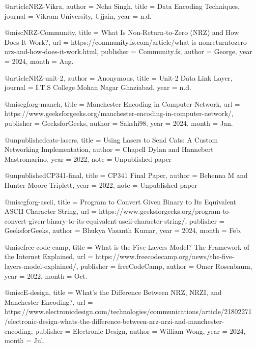 @article{NRZ-Vikra,
    author = {Neha Singh},
    title = {Data Encoding Techniques},
    journal = {Vikram University, Ujjain},
    year = {n.d.}
}

@misc{NRZ-Community, 
    title = {What Is Non-Return-to-Zero (NRZ) and How Does It Work?}, 
    url = {https://community.fs.com/article/what-is-nonreturntozero-nrz-and-how-does-it-work.html}, 
    publisher = {Community.fs}, 
    author = {George}, 
    year = {2024}, 
    month = {Aug.} 
}

@article{NRZ-unit-2,
    author = {Anonymous}, 
    title = {Unit-2 Data Link Layer}, 
    journal = {I.T.S College Mohan Nagar Ghaziabad}, 
    year = {n.d.}
}

@misc{gforg-manch, 
    title = {Manchester Encoding in Computer Network}, 
    url = {https://www.geeksforgeeks.org/manchester-encoding-in-computer-network/}, 
    publisher = {GeeksforGeeks}, 
    author = {Sakshi98}, 
    year = {2024}, 
    month = {Jan.} 
}

@unpublished{cats-lasers,
    title = {Using Lasers to Send Cats: A Custom Networking Implementation}, 
    author = {Chapell Dylan and Hannebert Mastromarino}, 
    year = {2022}, 
    note = {Unpublished paper}
}

@unpublished{CP341-final,
    title = {CP341 Final Paper}, 
    author = {Behenna M and Hunter Moore Triplett}, 
    year = {2022}, 
    note = {Unpublished paper}
}

@misc{gforg-ascii, 
    title = {Program to Convert Given Binary to Its Equivalent ASCII Character String}, 
    url = {https://www.geeksforgeeks.org/program-to-convert-given-binary-to-its-equivalent-ascii-character-string/}, 
    publisher = {GeeksforGeeks}, 
    author = {Bhukya Vasanth Kumar}, 
    year = {2024}, 
    month = {Feb.} 
}

@misc{free-code-camp, 
    title = {What is the Five Layers Model? The Framework of the Internet Explained}, 
    url = {https://www.freecodecamp.org/news/the-five-layers-model-explained/}, 
    publisher = {freeCodeCamp}, 
    author = {Omer Rosenbaum}, 
    year = {2022}, 
    month = {Oct.} 
}

@misc{E-design, 
    title = {What’s the Difference Between NRZ, NRZI, and Manchester Encoding?}, 
    url = {https://www.electronicdesign.com/technologies/communications/article/21802271/electronic-design-whats-the-difference-between-nrz-nrzi-and-manchester-encoding}, 
    publisher = {Electronic Design}, 
    author = {William Wong}, 
    year = {2024}, 
    month = {Jul.} 
}
